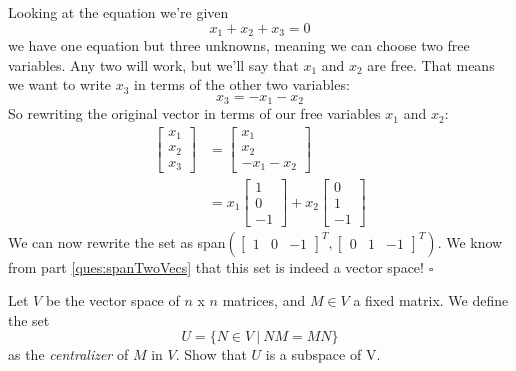 \begin{enumerate}
{	Looking at the equation we're given
	$$x_1 + x_2 + x_3 = 0$$
	we have one equation but three unknowns, meaning we can choose two free variables. Any two will work, but we'll say that $x_1$ and $x_2$ are free. That means we want to write $x_3$ in terms of the other two variables:
	$$x_3 = -x_1 - x_2$$
	So rewriting the original vector in terms of our free variables $x_1$ and $x_2$:
	\begin{align*}
		\begin{bmatrix}x_1\\x_2\\x_3\end{bmatrix} &= \begin{bmatrix}x_1\\x_2\\-x_1-x_2\end{bmatrix}\\
			&= x_1\begin{bmatrix}1\\0\\-1\end{bmatrix} + x_2\begin{bmatrix}0\\1\\-1\end{bmatrix}
	\end{align*}
	We can now rewrite the set as span$\left(\begin{bmatrix}1&0&-1\end{bmatrix}^T, \begin{bmatrix}0&1&-1\end{bmatrix}^T\right)$. We know from part \ref{ques:spanTwoVecs} that this set is indeed a vector space! $\square$
}

\qitem\label{ques:notAffine}{
Let $V$ be the vector space of $n$ x $n$ matrices, and $M \in V$ a fixed matrix. We define the set $$U = \{N \in V \: | \: NM = MN \}$$ as the \textit{centralizer} of $M$ in $V$. Show that $U$ is a subspace of V.
}



\end{enumerate}
